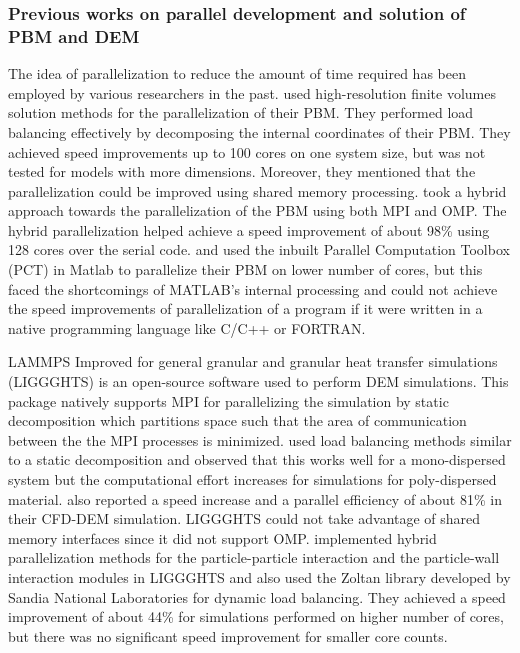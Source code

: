 \documentclass[preprint,11pt,authoryear]{elsarticle}
\begin{document}
\subsubsection{Previous works on parallel development and solution of PBM and DEM}
The idea of parallelization to reduce the amount of time required has been employed by various 
researchers in the past. \cite{Gunawan2008} used high-resolution finite volumes solution methods for 
the parallelization of their PBM. They performed load balancing effectively by 
decomposing the internal coordinates of their PBM. They achieved speed improvements up to 100 
cores on one system size, but was not tested for models with more dimensions. Moreover, they 
mentioned that the parallelization could be improved using shared memory processing. 
\cite{Bettencourt2017} took a hybrid approach towards the parallelization of the PBM using both 
MPI and OMP. The hybrid parallelization helped achieve 
a speed improvement of about 98\% using 128 cores over the serial code. \cite{Prakash2013a} and \cite{Prakash2013b} 
used the inbuilt Parallel Computation Toolbox (PCT) in Matlab \citep{pctMatlab} to parallelize their PBM on lower number 
of cores, but this faced the shortcomings of MATLAB's internal processing and 
could not achieve the 
speed improvements of parallelization of a program if it were written in a native programming language 
like C/C++ or FORTRAN. 

LAMMPS Improved for general granular and granular heat transfer simulations (LIGGGHTS) is an open-source software used to perform DEM simulations. This package natively 
supports MPI for parallelizing the simulation by static decomposition which partitions space such that 
the area of communication between the the MPI processes is minimized. \cite{kacianauskas2010} used 
load balancing methods similar to a static decomposition and observed that this works well for a 
mono-dispersed system but the computational effort increases for simulations for poly-dispersed 
material. \cite{Gopalakrishnan2013} also reported a speed increase and a parallel efficiency of about 
81\% in their CFD-DEM simulation. LIGGGHTS could not take advantage of shared memory interfaces 
since it did not support OMP. \cite{Berger2015} implemented hybrid parallelization methods for the 
particle-particle interaction and the particle-wall interaction modules in LIGGGHTS and also used the 
Zoltan library \citep{Boman2012} developed by Sandia National Laboratories for dynamic load 
balancing. They achieved a speed improvement of about 44\% for simulations performed on higher 
number of cores, but there was no significant speed improvement for smaller core counts. 
\end{document}
